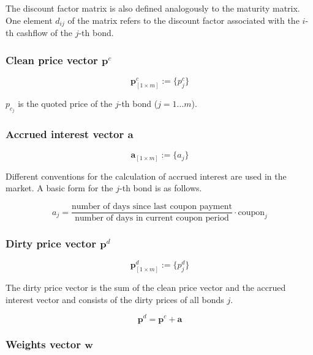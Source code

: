  The discount factor matrix is also defined analogously to the maturity matrix. One element $d_{ij}$ of the matrix refers to the discount factor associated with  the $i$-th cashflow of the $j$-th bond.

\subsubsection*{Clean price vector $\bm{p}^c$}

  \begin{equation}\label{pc}
\bm{p}^c_{\left[1\times m\right]}:= \{p^c_j\}
\end{equation}

$p_{c_j}$ is the quoted price of the $j$-th bond ($j=1...m$).

\subsubsection*{Accrued interest vector $\bm{a}$}

  \begin{equation}\label{a}
\bm{a}_{\left[1\times m\right]}:= \{a_j\}
\end{equation}

Different conventions for the calculation of accrued interest are used in the market. A basic form for the $j$-th bond is as follows.

\begin{equation}
    a_j= \frac{\mbox{number of days since last coupon payment}}{\mbox{number of days in current coupon period}}\cdot \mbox{coupon}_j
\end{equation}
 	

\subsubsection*{Dirty price vector $\bm{p}^d$}

\begin{equation}\label{pd}
    \bm{p}^d_{\left[1\times m\right]}:= \{p^d_j\}
\end{equation}

The dirty price vector is the sum of the clean price vector and the accrued interest vector and consists of the dirty prices of all bonds $j$.

\begin{displaymath}
\bm{p}^d=\bm{p}^c+\bm{a}
\end{displaymath}

\subsubsection*{Weights vector $\bm{w}$}

